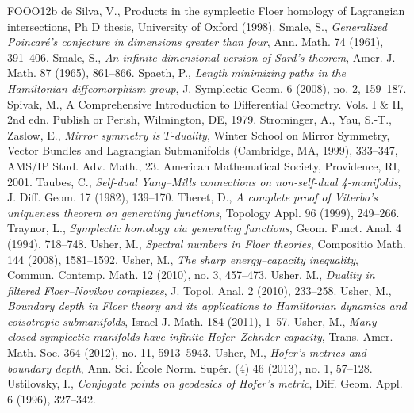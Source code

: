 \begin{thebibliography}{FOOO12b}
 de Silva, V., Products in the symplectic Floer homology of Lagrangian intersections, Ph D thesis, University of Oxford (1998).
 Smale, S., \textit{Generalized Poincaré\textquoteright{}s conjecture in dimensions greater than four}, Ann. Math. 74 (1961), 391--406.
 Smale, S., \textit{An infinite dimensional version of Sard\textquoteright{}s theorem}, Amer. J. Math. 87 (1965), 861--866.
 Spaeth, P., \textit{Length minimizing paths in the Hamiltonian diffeomorphism group}, J. Symplectic Geom. 6 (2008), no. 2, 159--187.
 Spivak, M., A Comprehensive Introduction to Differential Geometry. Vols. I \& II, 2nd edn. Publish or Perish, Wilmington, DE, 1979.
 Strominger, A., Yau, S.-T., Zaslow, E., \textit{Mirror symmetry is $T$-duality}, Winter School on Mirror Symmetry, Vector Bundles and Lagrangian Submanifolds (Cambridge, MA, 1999), 333--347, AMS/IP Stud. Adv. Math., 23. American Mathematical Society, Providence, RI, 2001.
 Taubes, C., \textit{Self-dual Yang--Mills connections on non-self-dual 4-manifolds}, J. Diff. Geom. 17 (1982), 139--170.
 Theret, D., \textit{A complete proof of Viterbo\textquoteright{}s uniqueness theorem on generating functions}, Topology Appl. 96 (1999), 249--266.
 Traynor, L., \textit{Symplectic homology via generating functions}, Geom. Funct. Anal. 4 (1994), 718--748.
 Usher, M., \textit{Spectral numbers in Floer theories}, Compositio Math. 144 (2008), 1581--1592.
 Usher, M., \textit{The sharp energy--capacity inequality}, Commun. Contemp. Math. 12 (2010), no. 3, 457--473.
 Usher, M., \textit{Duality in filtered Floer--Novikov complexes}, J. Topol. Anal. 2 (2010), 233--258.
 Usher, M., \textit{Boundary depth in Floer theory and its applications to Hamiltonian dynamics and coisotropic submanifolds}, Israel J. Math. 184 (2011), 1--57.
 Usher, M., \textit{Many closed symplectic manifolds have infinite Hofer--Zehnder capacity}, Trans. Amer. Math. Soc. 364 (2012), no. 11, 5913--5943.
 Usher, M., \textit{Hofer\textquoteright{}s metrics and boundary depth}, Ann. Sci. École Norm. Supér. (4) 46 (2013), no. 1, 57--128.
 Ustilovsky, I., \textit{Conjugate points on geodesics of Hofer\textquoteright{}s metric}, Diff. Geom. Appl. 6 (1996), 327--342.

\end{thebibliography}
